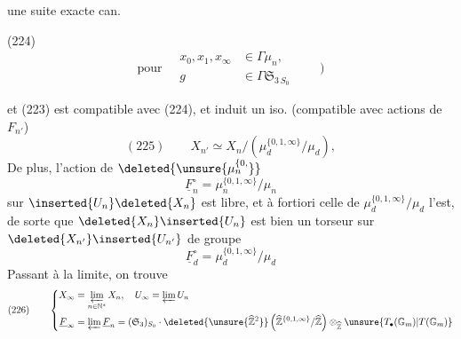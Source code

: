 

  une suite exacte can.

\noindent (224)\quad
{}
\[
\text{pour}\quad\begin{aligned}x_0,x_1,x_{\infty}&\in\Gamma\mu_n,\\g&\in\Gamma\mathfrak S_{3\,S_0}\end{aligned}\qquad\big)
\]

et  (223) est compatible avec (224), et induit un iso. (compatible avec actions de $F_{n'}$)
\[
(225)\qquad X_{n'}\simeq X_n/(\mu_d^{\{0,1,\infty\}}/\mu_d),
\]
De plus, l'action de $\deleted{\unsure{\mu_n^{\{0,}}}$
\[
\underline F_n^{\circ}=\mu_n^{\{0,1,\infty\}}/\mu_n
\]
sur $\inserted{U_n}\deleted{X_n}$ est libre, et à fortiori celle de $\mu_d^{\{0,1,\infty\}}/\mu_d$ l'est, de sorte que $\deleted{X_n}\inserted{U_n}$ est bien un torseur sur $\deleted{X_{n'}}\inserted{U_{n'}}$ de groupe
\[
\underline F_d^{\circ}=\mu_d^{\{0,1,\infty\}}/\mu_d
\]
Passant à la limite, on trouve
\[
(226)\qquad\left\{\begin{aligned}
X_{\infty}&=\varprojlim_{n\in\mathbb N^{*}}X_n,\quad U_{\infty}=\varprojlim U_n\\
\underline F_{\infty}&=\varprojlim\underline F_n=(\mathfrak S_3)_{S_0}\mathbin{\cdot}\deleted{\unsure{\widehat{\mathbb Z}^{2}}}\left(\widehat{\mathbb Z}^{\{0,1,\infty\}}/\widehat{\mathbb Z}\right)\otimes_{\widehat{\mathbb Z}}\unsure{T_{\bullet}(\mathbb G_m)|T(\mathbb G_m)}
\end{aligned}\right.
\]

